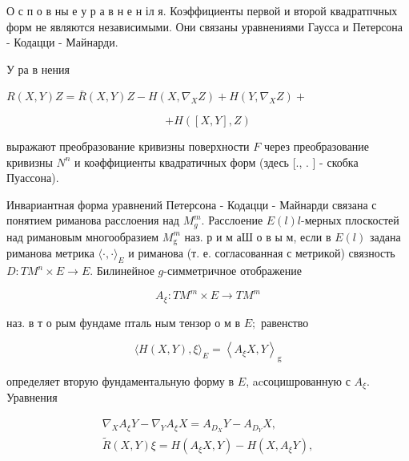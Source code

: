 \documentclass[10pt]{article}
\begin{document}
О с п о в ны е у р а в н е н іл я. Коэффициенты первой и второй квадратпчных форм не являются независимыми. Они связаны уравнениями Гаусса и Петерсона - Кодацци - Майнарди.



У ра в нения



$R(X, Y) Z=\bar{R}(X, Y) Z-H\left(X, \nabla_{X} Z\right)+H\left(Y, \nabla_{X} Z\right)+$



\[

+H([X, Y], Z)

\]



выражают преобразование кривизны поверхности $F$ через преобразование кривизны $N^{n}$ и коәффициенты квадратичных форм (здесь [., . ] - скобка Пуассона).



Инвариантная форма уравнений Петерсона - Кодацци - Майнарди связана с понятием риманова расслоения над $M_{g}^{m}$. Расслоение $E(l) l$-мерных плоскостей над римановым многообразием $M_{\mathrm{g}}^{m}$ наз. р и м аШ о в ы м, если в $E(l)$ задана риманова метрика $\langle\cdot, \cdot\rangle_{E}$ и риманова (т. е. согласованная с метрикой) связность $D: T M^{n} \times E \rightarrow E$. Билинейное $g$-симметричное отображение



\[

A_{\xi}: T M^{m} \times E \rightarrow T M^{m}

\]



наз. в т о рым фундаме пталь ным тензор о м в $E ;$ равенство



\[

\langle H(X, Y), \xi\rangle_{E}=\left\langle A_{\xi} X, Y\right\rangle_{\mathrm{g}}

\]



определяет вторую фундаментальную форму в $E$, acсоцишрованную с $A_{\xi}$. Уравнения



\[

\begin{gathered}

\nabla_{X} A_{\xi} Y-\nabla_{Y} A_{\xi} X=A_{D_{X}} Y-A_{D_{Y}} X, \\

\tilde{R}(X, Y) \xi=H\left(A_{\xi} X, Y\right)-H\left(X, A_{\xi} Y\right),

\end{gathered}

\]
\end{document}
